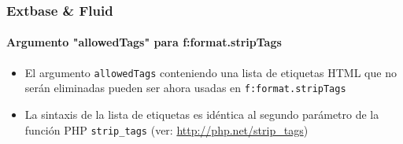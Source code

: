 
\begin{frame}[fragile]
	\frametitle{Extbase \& Fluid}
	\framesubtitle{Argumento "allowedTags" para f:format.stripTags}

	\begin{itemize}

		\item El argumento \texttt{allowedTags} conteniendo una lista de etiquetas HTML
			que no serán eliminadas pueden ser ahora usadas en \texttt{f:format.stripTags}

		\item La sintaxis de la lista de etiquetas es idéntica al segundo parámetro de la función PHP
			\texttt{strip\_tags} (ver: \url{http://php.net/strip_tags})

	\end{itemize}

\end{frame}


